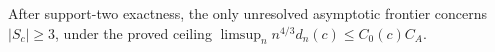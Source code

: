 After support-two exactness, the only unresolved asymptotic frontier concerns \(|S_c|\geq3\), under the proved ceiling \(\limsup_n n^{4/3}d_n(c)\leq C_0(c)C_A\).